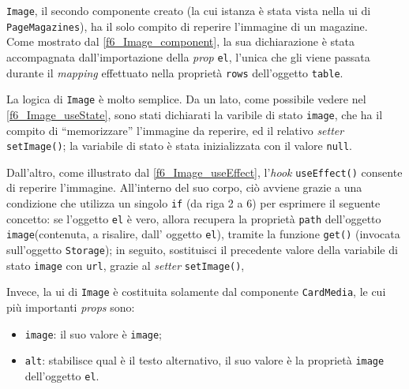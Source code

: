 

\texttt{Image}, il secondo componente creato (la cui istanza è stata vista nella \acrshort{ui} di \texttt{PageMagazines}), ha il solo compito di reperire l'immagine di un magazine.\\
Come mostrato dal \autoref{f6_Image_component}, la sua dichiarazione è stata accompagnata dall'importazione della \textit{prop} \texttt{el}, l'unica che gli viene passata durante il \textit{mapping} effettuato nella proprietà \texttt{rows} dell'oggetto \texttt{table}.


La logica di \texttt{Image} è molto semplice. Da un lato, come possibile vedere nel \autoref{f6_Image_useState}, sono stati dichiarati la varibile di stato \texttt{image}, che ha il compito di “memorizzare” l'immagine da reperire, ed il relativo \textit{setter} \texttt{setImage()}; la variabile di stato è stata inizializzata con il valore \texttt{null}.


Dall'altro, come illustrato dal \autoref{f6_Image_useEffect}, l'\textit{hook} \texttt{useEffect()} consente di reperire l'immagine. All'interno del suo corpo, ciò avviene grazie a una condizione che utilizza un singolo \texttt{if} (da riga 2 a 6) per esprimere il seguente concetto: se l'oggetto \texttt{el} è vero, allora recupera la proprietà \texttt{path} dell'oggetto \texttt{image}(contenuta, a risalire, dall' oggetto \texttt{el}), tramite la funzione \texttt{get()} (invocata sull'oggetto \texttt{Storage}); in seguito, sostituisci il precedente valore della variabile di stato \texttt{image} con \texttt{url}, grazie al \textit{setter} \texttt{setImage()}, 


Invece, la \acrshort{ui} di \texttt{Image} è costituita solamente dal componente \texttt{CardMedia}, le cui più importanti \textit{props} sono:
\begin{itemize}
    \item \texttt{image}: il suo valore è \texttt{image};
    
    \item \texttt{alt}: stabilisce qual è il testo alternativo, il suo valore è la proprietà \texttt{image} dell'oggetto \texttt{el}.
\end{itemize}

